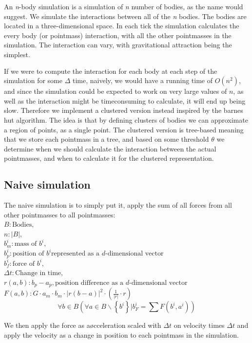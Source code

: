 An \textit{n}-body simulation is a simulation of \textit{n} number of bodies, as
the name would suggest. We simulate the interactions between all of the
\textit{n} bodies. The bodies are located in a three-dimensional space. In each
tick the simulation calculates the every body (or pointmass) interaction, with
all the other pointmasses in the simulation. The interaction can vary, with
gravitational attraction being the simplest.

If we were to compute the interaction for each body at each step of the
simulation for some $\Delta$ time, naively, we would have a running time of
$O(n^2)$, and since the simulation could be expected to work on very large
values of $n$, as well as the interaction might be timeconsuming to calculate,
it will end up being slow. Therefore we implement a clustered version instead
inspired by the barnes hut algorithm. The idea is that by defining clusters of
bodies we can approximate a region of points, as a single point. The clustered
version is tree-based meaning that we store each pointmass in a tree, and based
on some threshold $\theta$ we determine when we should calculate the interaction
between the actual pointmasses, and when to calculate it for the clustered
representation.
\subsection{Naive simulation}
The naive simulation is to simply put it, apply the sum of all forces from all
other pointmasses to all pointmasses:         \\
$B: \mbox{Bodies},$                           \\
$n: |B|,$                                     \\
$b^i_m: \mbox{mass of } b^i,$                 \\
$b^i_p: \mbox{position of } b^i \mbox{represented as a $d$-dimensional vector}$\\
$b^i_f: \mbox{force of } b^i,$                \\
$\Delta t: \mbox{Change in time},$                \\
$r(a, b): b_p - a_p, \mbox{position difference as a $d$-dimensional vector}$\\
$F(a, b): G \cdot a_m \cdot b_m \cdot |r(b - a)|^2 \cdot (\frac{1}{|r|} \cdot r)$
$$\forall b \in B (\forall a \in B \backslash \left\{ b^i\right\} | b^i_F = \sum F(b^i, a^i))$$

We then apply the force as aøcceleration scaled with $\Delta t$ on velocity
times $\Delta t$ and apply the velocity as a change in position to each
pointmass in the simulation.

